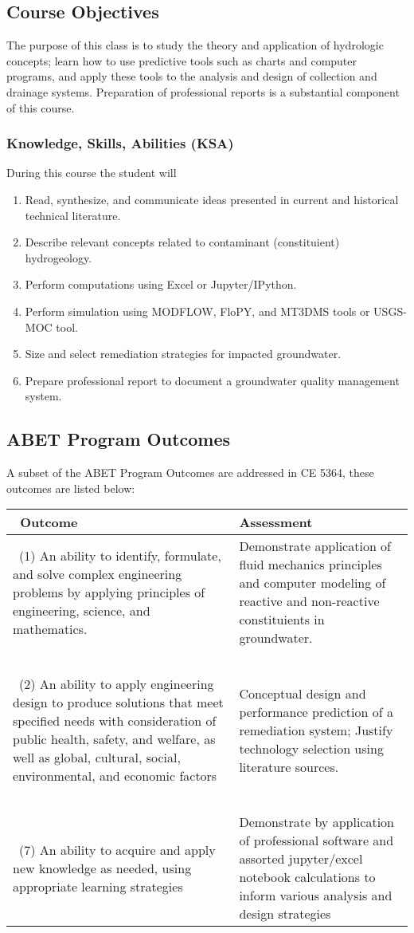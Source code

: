 \documentclass[12pt]{article}
\begin{document}
\subsection*{{Course Objectives}}
The purpose of this class is to study the theory and application of hydrologic concepts; learn how to use predictive tools such as charts and computer programs, and apply these tools to the analysis and design of collection and drainage systems.  Preparation of professional reports is a substantial component of this course.
\subsubsection*{{Knowledge, Skills, Abilities (KSA)}}
During this course the student will
\begin{enumerate}
\item Read, synthesize, and communicate ideas presented in current and historical technical literature.
\item Describe relevant concepts related to contaminant (constituient) hydrogeology.
\item Perform computations using Excel or Jupyter/IPython.
\item Perform simulation using MODFLOW, FloPY, and MT3DMS tools or USGS-MOC tool.
\item Size and select remediation strategies for impacted groundwater.
\item Prepare professional report to document a groundwater quality management system.  

\end{enumerate}

\subsection*{ABET Program Outcomes}
A subset of the ABET Program Outcomes are addressed in CE 5364, these outcomes are listed below:

\begin{tabular}{p{3.0in}p{3.0in}}
\ Outcome &  Assessment \\
\hline
\ (1) An ability to identify, formulate, and solve complex engineering problems by applying principles of engineering, science, and mathematics. & Demonstrate application of fluid mechanics principles and computer modeling of reactive and non-reactive constituients in groundwater.\\
\ ~ & ~ \\
\ (2) An ability to apply engineering design to produce solutions that meet specified needs with consideration of public health, safety, and welfare, as well as global, cultural, social, environmental, and economic factors & Conceptual design and performance prediction of a remediation system; Justify technology selection using literature sources.\\
\ ~ & ~ \\
\ (7) An ability to acquire and apply new knowledge as needed, using appropriate learning strategies & Demonstrate by application of professional software and assorted jupyter/excel notebook calculations to inform various analysis and design strategies\\
\end{tabular}
\end{document}
